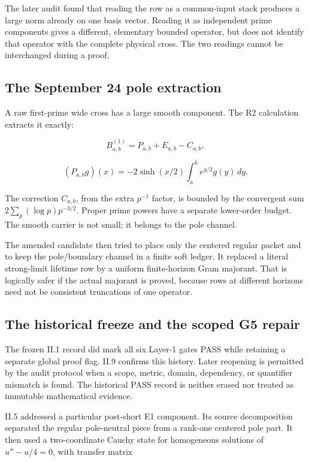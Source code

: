 \documentclass[
  10pt,
  a4paper,
  10pt,
  oneside,
  openany]{book}
\begin{document}
The later audit found that reading the row as a common-input stack
produces a large norm already on one basis vector. Reading it as
independent prime components gives a different, elementary bounded
operator, but does not identify that operator with the complete physical
cross. The two readings cannot be interchanged during a proof.

\subsection{The September 24 pole
extraction}\label{the-september-24-pole-extraction}

A raw first-prime wide cross has a large smooth component. The R2
calculation extracts it exactly:

\[
B_{a,b}^{(1)}=P_{a,b}+E_{a,b}-C_{a,b},
\tag{11.1}\label{eq:11.1}
\]

\[
(P_{a,b}g)(x)=-2\sinh(x/2)\int_a^be^{y/2}g(y)\,dy.
\tag{11.2}\label{eq:11.2}
\]

The correction \(C_{a,b}\), from the extra \(p^{-1}\) factor, is bounded
by the convergent sum \(2\sum_p(\log p)p^{-3/2}\). Proper prime powers
have a separate lower-order budget. The smooth carrier is not small; it
belongs to the pole channel.

The amended candidate then tried to place only the centered regular
packet and to keep the pole/boundary channel in a finite soft ledger. It
replaced a literal strong-limit lifetime row by a uniform finite-horizon
Gram majorant. That is logically safer if the actual majorant is proved,
because rows at different horizons need not be consistent truncations of
one operator.

\subsection{The historical freeze and the scoped G5
repair}\label{the-historical-freeze-and-the-scoped-g5-repair}

The frozen II.1 record did mark all six Layer-1 gates PASS while
retaining a separate global proof flag. II.9 confirms this history.
Later reopening is permitted by the audit protocol when a scope, metric,
domain, dependency, or quantifier mismatch is found. The historical PASS
record is neither erased nor treated as immutable mathematical evidence.

II.5 addressed a particular post-short E1 component. Its source
decomposition separated the regular pole-neutral piece from a rank-one
centered pole part. It then used a two-coordinate Cauchy state for
homogeneous solutions of \(u''-u/4=0\), with transfer matrix
\end{document}
